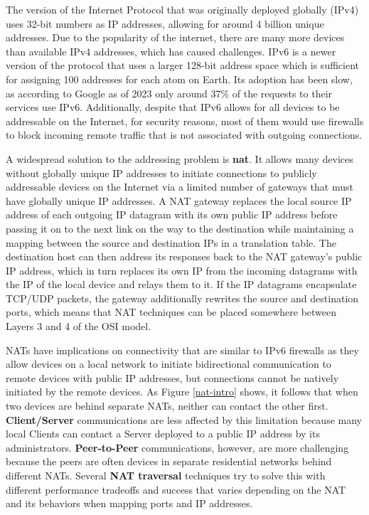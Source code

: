 The version of the Internet Protocol that was originally deployed
globally (IPv4) uses 32-bit numbers as IP addresses, allowing for around
4 billion unique addresses. Due to the popularity of the internet, there
are many more devices than available IPv4 addresses, which has caused
challenges. IPv6 is a newer version of the protocol that uses a larger
128-bit address space which is sufficient for assigning 100 addresses
for each atom on Earth. Its adoption has been slow, as according to
Google as of 2023 only around 37\% of the requests to their services use
IPv6. Additionally, despite that IPv6 allows for all devices to be
addressable on the Internet, for security reasons, most of them would
use firewalls to block incoming remote traffic that is not associated
with outgoing connections.

A widespread solution to the addressing problem is \textbf{\gls{nat}}.
It allows many devices without globally unique IP addresses to initiate
connections to publicly addressable devices on the Internet via a
limited number of gateways that must have globally unique IP addresses.
A NAT gateway replaces the local source IP address of each outgoing IP
datagram with its own public IP address before passing it on to the next
link on the way to the destination while maintaining a mapping between
the source and destination IPs in a translation table. The destination
host can then address its responses back to the NAT gateway's public IP
address, which in turn replaces its own IP from the incoming datagrams
with the IP of the local device and relays them to it. If the IP
datagrams encapsulate TCP/UDP packets, the gateway additionally rewrites
the source and destination ports, which means that NAT techniques can be
placed somewhere between Layers 3 and 4 of the OSI model.

NATs have implications on connectivity that are similar to IPv6
firewalls as they allow devices on a local network to initiate
bidirectional communication to remote devices with public IP addresses,
but connections cannot be natively initiated by the remote devices. As
Figure \ref{nat-intro} shows, it follows that when two devices are
behind separate NATs, neither can contact the other first.
\textbf{Client/Server} communications are less affected by this
limitation because many local Clients can contact a Server deployed to a
public IP address by its administrators. \textbf{Peer-to-Peer}
communications, however, are more challenging because the peers are
often devices in separate residential networks behind different NATs.
Several \textbf{NAT traversal} techniques try to solve this with
different performance tradeoffs and success that varies depending on the
NAT \autocite{natBehaviorRFC} and its behaviors when mapping ports and
IP addresses.

